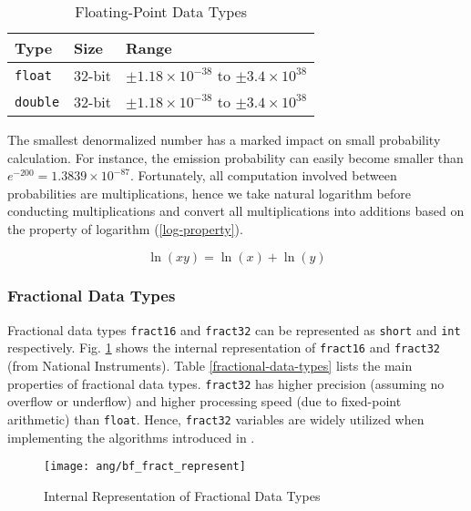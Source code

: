 \begin{table}[H]
\centering
\caption{Floating-Point Data Types}
\label{floating-point-data-types}
\begin{tabu} to \textwidth {XXX}
\toprule
Type &Size &Range\\
\hline
\texttt{float} &32-bit &$\pm 1.18 \times 10^{-38}$ to $\pm 3.4 \times 10^{38}$\\
\hline
\texttt{double} &32-bit &$\pm 1.18 \times 10^{-38}$ to $\pm 3.4 \times 10^{38}$\\
\bottomrule
\end{tabu}
\end{table}

The smallest denormalized number has a marked impact on small probability calculation. For instance, the emission probability can easily become smaller than $e^{-200} = 1.3839 \times 10^{-87}$. Fortunately, all computation involved between probabilities are multiplications, hence we take natural logarithm before conducting multiplications and convert all multiplications into additions based on the property of logarithm (\ref{log-property}).

\begin{equation}
\label{log-property}
\ln(xy) = \ln(x) + \ln(y)
\end{equation}


\subsubsection{Fractional Data Types}

Fractional data types \texttt{fract16} and \texttt{fract32} can be represented as \texttt{short} and \texttt{int} respectively. Fig. \ref{bf_fract_represent} shows the internal representation of \texttt{fract16} and \texttt{fract32} (from National Instruments). Table \ref{fractional-data-types} lists the main properties of fractional data types. \texttt{fract32} has higher precision (assuming no overflow or underflow) and higher processing speed (due to fixed-point arithmetic) than \texttt{float}. Hence, \texttt{fract32} variables are widely utilized when implementing the algorithms introduced in .

\begin{figure}[H]
\centering
\texttt{[image: ang/bf\_fract\_represent]}
\caption{Internal Representation of Fractional Data Types}
\label{bf_fract_represent}
\end{figure}

